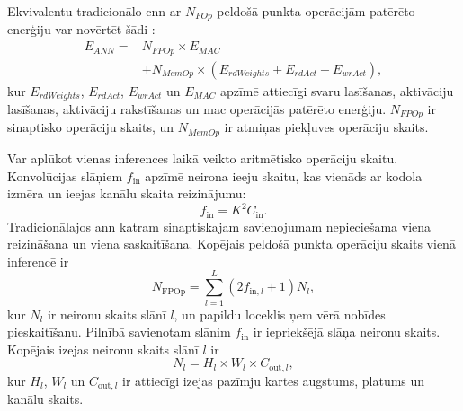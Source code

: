 
Ekvivalentu tradicionālo \Gls{cnn} ar \(N_{FOp}\) peldošā punkta operācijām patērēto enerģiju var novērtēt šādi \cite{dampfhoffer2022}:
\begin{equation}
\begin{split}
  E_{ANN} = & N_{FPOp} \times E_{MAC} \\
            & + N_{MemOp} \times (E_{rdWeights} + E_{rdAct} + E_{wrAct}),
\end{split}
\label{eq:eann}
\end{equation}
kur \(E_{rdWeights}\), \(E_{rdAct}\), \(E_{wrAct}\) un \(E_{MAC}\) apzīmē attiecīgi svaru lasīšanas, aktivāciju lasīšanas, aktivāciju rakstīšanas un \Gls{mac} operācijās patērēto enerģiju. \(N_{FPOp}\) ir sinaptisko operāciju skaits, un \(N_{MemOp}\) ir atmiņas piekļuves operāciju skaits.

Var aplūkot vienas inferences laikā veikto aritmētisko operāciju skaitu. Konvolūcijas slāņiem \(f_{\mathrm{in}}\) apzīmē neirona ieeju skaitu, kas vienāds ar kodola izmēra un ieejas kanālu skaita reizinājumu:
\begin{equation}
  f_{\mathrm{in}} = K^2 C_{\mathrm{in}}.
\end{equation}
Tradicionālajos \Gls{ann} katram sinaptiskajam savienojumam nepieciešama viena reizināšana un viena saskaitīšana. Kopējais
peldošā punkta operāciju skaits vienā inferencē ir \cite{rueckauer2017}
\begin{equation}
  N_{\mathrm{FPOp}} =
  \sum_{l=1}^{L}
  (2f_{\mathrm{in},l}+1)N_l,
\end{equation}
kur \(N_l\) ir neironu skaits slānī \(l\), un papildu loceklis ņem vērā nobīdes pieskaitīšanu. Pilnībā savienotam slānim \(f_{\mathrm{in}}\) ir iepriekšējā slāņa neironu skaits. Kopējais izejas neironu skaits slānī \(l\) ir
\begin{equation}
    N_l = H_l \times W_l \times C_{\mathrm{out},l},
\end{equation}
kur \(H_l\), \(W_l\) un \(C_{\mathrm{out},l}\) ir attiecīgi izejas pazīmju kartes augstums, platums un kanālu skaits.

